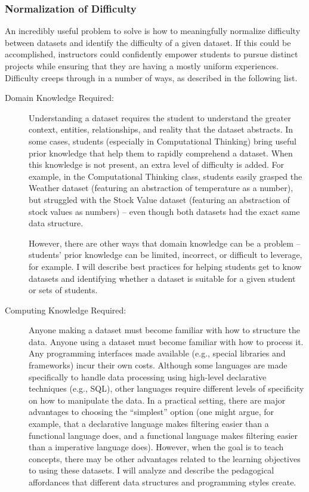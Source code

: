 \subsubsection{Normalization of Difficulty}

An incredibly useful problem to solve is how to meaningfully normalize difficulty between datasets and identify the difficulty of a given dataset. If this could be accomplished, instructors could confidently empower students to pursue distinct projects while ensuring that they are having a mostly uniform experiences. Difficulty creeps through in a number of ways, as described in the following list. \begin{description}
	  \item[Domain Knowledge Required:] Understanding a dataset requires the student to understand the greater context, entities, relationships, and reality that the dataset abstracts. In some cases, students (especially in Computational Thinking) bring useful prior knowledge that help them to rapidly comprehend a dataset. When this knowledge is not present, an extra level of difficulty is added. For example, in the Computational Thinking class, students easily grasped the Weather dataset (featuring an abstraction of temperature as a number), but struggled with the Stock Value dataset (featuring an abstraction of stock values as numbers) -- even though both datasets had the exact same data structure.
		
		However, there are other ways that domain knowledge can be a problem -- students' prior knowledge can be limited, incorrect, or difficult to leverage, for example. I will describe best practices for helping students get to know datasets and identifying whether a dataset is suitable for a given student or sets of students.
		\item[Computing Knowledge Required:] Anyone making a dataset must become familiar with how to structure the data. Anyone using a dataset must become familiar with how to process it. Any programming interfaces made available (e.g., special libraries and frameworks) incur their own costs. Although some languages are made specifically to handle data processing using high-level declarative techniques (e.g., SQL), other languages require different levels of specificity on how to manipulate the data. In a practical setting, there are major advantages to choosing the ``simplest'' option (one might argue, for example, that a declarative language makes filtering easier than a functional language does, and a functional language makes filtering easier than a imperative language does). However, when the goal is to teach concepts, there may be other advantages related to the learning objectives to using these datasets. I will analyze and describe the pedagogical affordances that different data structures and programming styles create.
		

\end{description}
